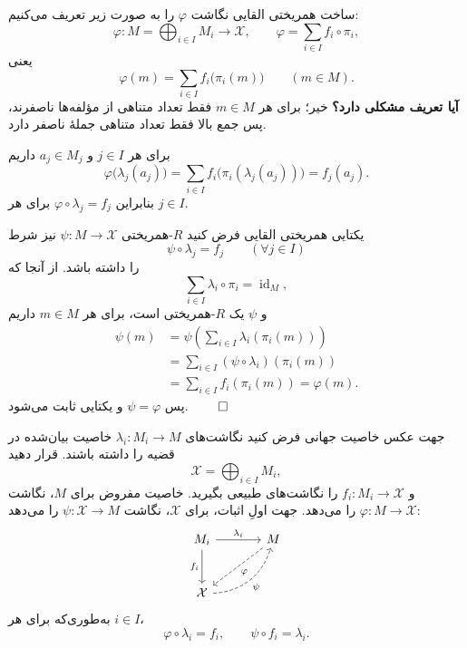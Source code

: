\begin{frame}[t]{ساخت همریختی القایی}
    \label{lec08:induced-map}
    نگاشت $\varphi$ را به صورت زیر تعریف می‌کنیم:
    \[
        \varphi:M=\bigoplus_{i\in I}M_i\longrightarrow\mathcal{X},
        \qquad \varphi=\sum_{i\in I}f_i\circ\pi_i,
    \]
    یعنی
    \[
        \varphi(m)=\sum_{i\in I}f_i\bigl(\pi_i(m)\bigr)
        \qquad(m\in M).
    \]
    \textbf{آیا تعریف مشکلی دارد؟}
    خیر؛ برای هر $m\in M$ فقط تعداد متناهی از مؤلفه‌ها ناصفرند،
    پس جمع بالا فقط تعداد متناهی جملهٔ ناصفر دارد.

    برای هر $j\in I$ و $a_j\in M_j$ داریم
    \[
        \varphi\bigl(\lambda_j(a_j)\bigr)
        =\sum_{i\in I}f_i\bigl(\pi_i(\lambda_j(a_j))\bigr)
        =f_j(a_j).
    \]
    بنابراین $\varphi\circ\lambda_j=f_j$ برای هر $j\in I$.
\end{frame}

\begin{frame}[t]{یکتایی همریختی القایی}
    \label{lec08:induced-map-unique}
    فرض کنید $R$-همریختی $\psi:M\to\mathcal{X}$ نیز شرط
    \[
        \psi\circ\lambda_j=f_j\qquad(\forall j\in I)
    \]
    را داشته باشد. از آنجا که
    \[
        \sum_{i\in I}\lambda_i\circ\pi_i=\operatorname{id}_M,
    \]
    و $\psi$ یک $R$-همریختی است، برای هر $m\in M$ داریم
    \[
        \begin{aligned}
        \psi(m)
        &=\psi\!\left(\sum_{i\in I}\lambda_i(\pi_i(m))\right)\\
        &=\sum_{i\in I}(\psi\circ\lambda_i)(\pi_i(m))\\
        &=\sum_{i\in I}f_i(\pi_i(m))=\varphi(m).
        \end{aligned}
    \]
    پس $\psi=\varphi$ و یکتایی ثابت می‌شود.
    \hfill\(\qed\)
\end{frame}

\begin{frame}[t]{جهت عکس خاصیت جهانی}
    \label{lec08:reverse-construction}
    فرض کنید نگاشت‌های $\lambda_i:M_i\to M$ خاصیت بیان‌شده در قضیه را داشته باشند.
    قرار دهید
    \[
        \mathcal{X}=\bigoplus_{i\in I}M_i,
    \]
    و $f_i:M_i\to\mathcal{X}$ را نگاشت‌های طبیعی بگیرید.
    خاصیت مفروض برای $M$، نگاشت $\varphi:M\to\mathcal{X}$ را می‌دهد.
    جهت اولِ اثبات، برای $\mathcal{X}$، نگاشت $\psi:\mathcal{X}\to M$ را می‌دهد:
    \[
        \begin{tikzcd}[column sep=large,row sep=large,ampersand replacement=\&]
            M_i\arrow[r,"\lambda_i"]\arrow[d,"f_i" swap]
            \& M\arrow[dl,dashed,"\varphi"]\\
            \mathcal{X}\arrow[ur,dashed,bend right=35,"\psi" swap]\&
        \end{tikzcd}
    \]
    به‌طوری‌که برای هر $i\in I$،
    \[
        \varphi\circ\lambda_i=f_i,
        \qquad \psi\circ f_i=\lambda_i.
    \]
\end{frame}

